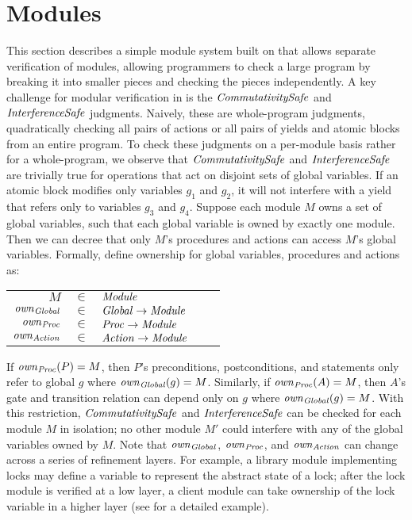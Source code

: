 \section{Modules}
\label{sec:modules}

This section describes a simple module system built on \civl that allows separate verification of modules,
allowing programmers to check a large program by breaking it into smaller pieces and checking the pieces independently.
A key challenge for modular verification in \civl is the $\mathit{CommutativitySafe}$ and $\mathit{InterferenceSafe}$ judgments.
Naively, these are whole-program judgments,
quadratically checking all pairs of actions or all pairs of yields and atomic blocks from an entire program.
To check these judgments on a per-module basis rather for a whole-program,
we observe that $\mathit{CommutativitySafe}$ and $\mathit{InterferenceSafe}$ are trivially true for operations that act on disjoint sets of global variables.
If an atomic block modifies only variables $g_1$ and $g_2$, it will not interfere with a yield that refers only to variables $g_3$ and $g_4$.
Suppose each module $M$ owns a set of global variables, such that each global variable is owned by exactly one module.
Then we can decree that only $M$'s procedures and actions can access $M$'s global variables.
Formally, define ownership for global variables, procedures and actions as:

\begin{tabular}{rclcl}
$M$ & $\in$ & $\mathit{Module}$ \\
$\mathit{own}_{\mathit{Global}}$ & $\in$ & $\mathit{Global} \rightarrow \mathit{Module}$ \\
$\mathit{own}_{\mathit{Proc}}$ & $\in$ & $\mathit{Proc} \rightarrow \mathit{Module}$ \\
$\mathit{own}_{\mathit{Action}}$ & $\in$ & $\mathit{Action} \rightarrow \mathit{Module}$ \\
\end{tabular}

If $\mathit{own}_{\mathit{Proc}}(P) = M$, then $P$'s preconditions, postconditions, and statements only refer to global $g$ where $\mathit{own}_{\mathit{Global}}(g) = M$.
Similarly, if $\mathit{own}_{\mathit{Proc}}(A) = M$, then $A$'s gate and transition relation can depend only on $g$ where $\mathit{own}_{\mathit{Global}}(g) = M$.
With this restriction, $\mathit{CommutativitySafe}$ and $\mathit{InterferenceSafe}$ can be checked for each module $M$ in isolation;
no other module $M'$ could interfere with any of the global variables owned by $M$.
Note that $\mathit{own}_{\mathit{Global}}$, $\mathit{own}_{\mathit{Proc}}$, and $\mathit{own}_{\mathit{Action}}$ can change across a series of refinement layers.
For example, a library module implementing locks may define a variable to represent the abstract state of a lock;
after the lock module is verified at a low layer,
a client module can take ownership of the lock variable in a higher layer
(see \cite{gc-techreport} for a detailed example).
